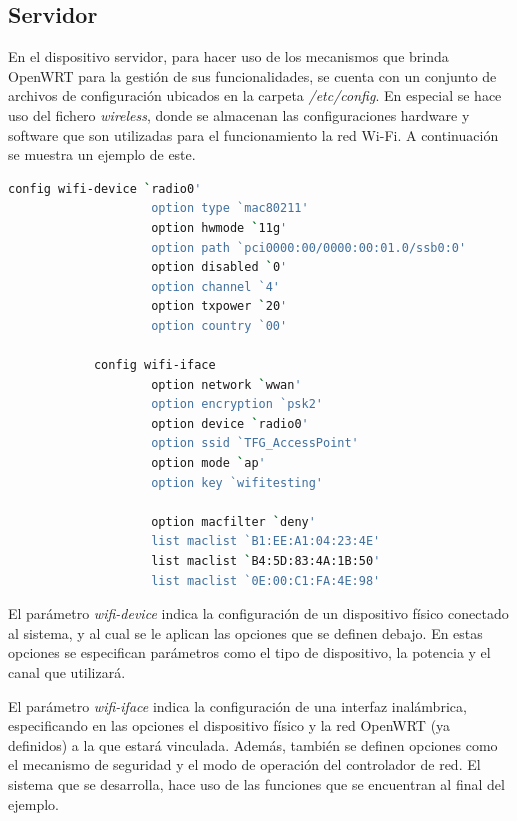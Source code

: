 \documentclass[12pt]{article}
\begin{document}
    \subsection{Servidor}
        En el dispositivo servidor, para hacer uso de los mecanismos que brinda OpenWRT para la gestión de sus funcionalidades, se cuenta con un conjunto de archivos de configuración ubicados en la carpeta \textit{/etc/config}. En especial se hace uso del fichero \textit{wireless}, donde se almacenan las configuraciones hardware y software que son utilizadas para el funcionamiento la red Wi-Fi.  A continuación se muestra un ejemplo de este.
        \begin{lstlisting}[caption=/etc/config/wireless, language=bash]
            config wifi-device `radio0'
                    option type `mac80211'
                    option hwmode `11g'
                    option path `pci0000:00/0000:00:01.0/ssb0:0'
                    option disabled `0'
                    option channel `4'
                    option txpower `20'
                    option country `00'

            config wifi-iface
                    option network `wwan'
                    option encryption `psk2'
                    option device `radio0'
                    option ssid `TFG_AccessPoint'
                    option mode `ap'
                    option key `wifitesting'

                    option macfilter `deny'
                    list maclist `B1:EE:A1:04:23:4E'
                    list maclist `B4:5D:83:4A:1B:50'
                    list maclist `0E:00:C1:FA:4E:98'
        \end{lstlisting}

        El parámetro \textit{wifi-device} indica la configuración de un dispositivo físico conectado al sistema, y al cual se le aplican las opciones que se definen debajo. En estas opciones se especifican parámetros como el tipo de dispositivo, la potencia y el canal que utilizará.

        El parámetro \textit{wifi-iface} indica la configuración de una interfaz inalámbrica, especificando en las opciones el dispositivo físico y la red OpenWRT (ya definidos) a la que estará vinculada. Además, también se definen opciones como el mecanismo de seguridad y el modo de operación del controlador de red. El sistema que se desarrolla, hace uso de las funciones que se encuentran al final del ejemplo.
        
\end{document}
